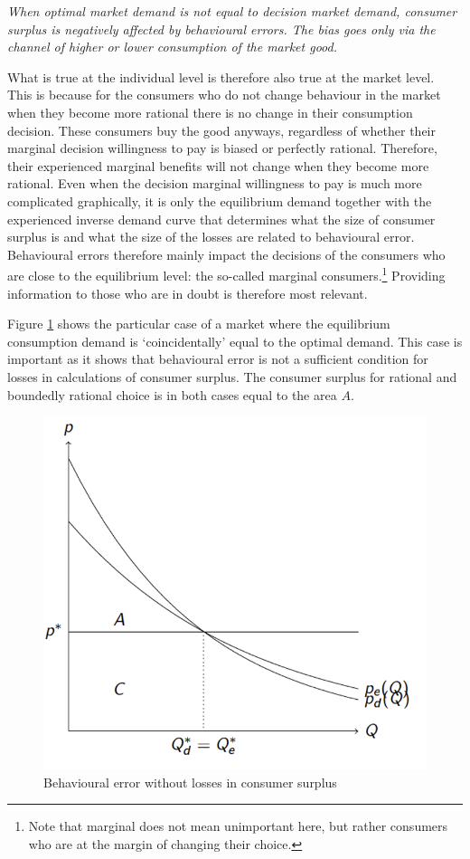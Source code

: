 \documentclass[
]{book}
\begin{document}
\emph{When optimal market demand is not equal to decision market demand, consumer surplus is negatively affected by behavioural errors. The bias goes only via the channel of higher or lower consumption of the market good.}

What is true at the individual level is therefore also true at the market level. This is because for the consumers who do not change behaviour in the market when they become more rational there is no change in their consumption decision. These consumers buy the good anyways, regardless of whether their marginal decision willingness to pay is biased or perfectly rational. Therefore, their experienced marginal benefits will not change when they become more rational. Even when the decision marginal willingness to pay is much more complicated graphically, it is only the equilibrium demand together with the experienced inverse demand curve that determines what the size of consumer surplus is and what the size of the losses are related to behavioural error. Behavioural errors therefore mainly impact the decisions of the consumers who are close to the equilibrium level: the so-called marginal consumers.\footnote{Note that marginal does not mean unimportant here, but rather consumers who are at the margin of changing their choice.} Providing information to those who are in doubt is therefore most relevant.

Figure \ref{fig:beherrors2} shows the particular case of a market where the equilibrium consumption demand is `coincidentally' equal to the optimal demand. This case is important as it shows that behavioural error is not a sufficient condition for losses in calculations of consumer surplus. The consumer surplus for rational and boundedly rational choice is in both cases equal to the area \(A\).

\begin{figure}
\includegraphics[width=10in]{./figures/beh_errors2} \caption{Behavioural error without losses in consumer surplus}\label{fig:beherrors2}
\end{figure}
\end{document}
